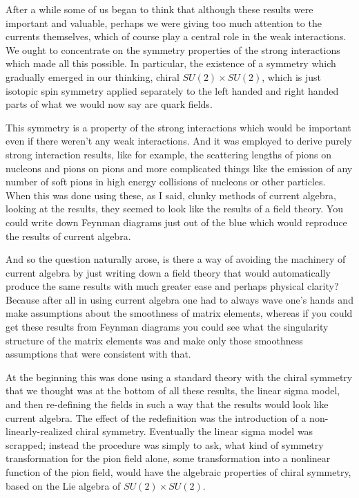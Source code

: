 After a while some of us began to think that although these results were important and valuable, perhaps we were giving too much attention to the currents themselves, which of course play a central role in the weak interactions. We ought to concentrate on the symmetry properties of the strong interactions which made all this possible. In particular, the existence of a symmetry which gradually emerged in our thinking, chiral $SU(2)\times SU(2)$, which is just isotopic spin symmetry applied separately to the left handed and right handed parts of what we would now say are quark fields. 

This symmetry is a property of the strong interactions which would be important even if there weren't any weak interactions. And it was employed to derive purely strong interaction results, like for example, the scattering lengths of pions on nucleons and pions on pions
and more complicated things like the emission of any number of soft pions in high energy collisions of   nucleons or other particles. When this was done using these, as I said, clunky methods of current algebra, looking at the results, they seemed to look like the results of a field theory. You could write down Feynman diagrams just out of the blue which would reproduce the results of current algebra. 

And so the question naturally arose, is there a way of avoiding the machinery of current algebra by just writing down a field theory that would automatically produce the same results with much greater ease and perhaps physical clarity? Because after all in using current algebra one had to always wave one's hands and make assumptions about the smoothness of matrix elements, whereas if you could get these results from Feynman diagrams you could see what the singularity structure of the matrix elements was and make only those smoothness assumptions that were consistent with that. 

At the beginning this was done using a standard theory with the chiral symmetry that we thought was at the bottom of all these results, the linear sigma model, and then re-defining the fields in such a way that the results would look like current algebra.  The effect of the redefinition was the introduction of a non-linearly-realized chiral symmetry.  Eventually the linear sigma model was scrapped;  instead the procedure was simply to ask, what kind of symmetry transformation for the pion field alone, some transformation into a nonlinear function of the pion field, would have the algebraic properties of  chiral symmetry, based on the Lie algebra of $SU(2)\times SU(2)$. 

